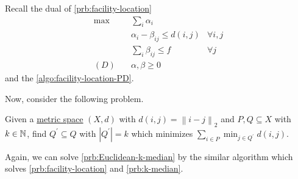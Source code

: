 \begin{prev}
	Recall the dual of \autoref{prb:facility-location}
	\begin{align*}
		\max~    & \sum_{i} \alpha _i                                  \\
		         & \alpha _i - \beta _{ij} \leq d(i, j) & \forall i, j \\
		         & \sum_{i} \beta _{ij} \leq f          & \forall j    \\
		(D)\quad & \alpha , \beta \geq 0
	\end{align*}
	and the \autoref{algo:facility-location-PD}.
\end{prev}

Now, consider the following problem.

\begin{problem}\label{prb:Euclidean-k-median}
Given a \hyperref[def:metric]{metric space} \((X, d)\) with \(d(i, j) = \left\lVert i - j\right\rVert_2\) and \(P, Q\subseteq X\) with \(k\in \mathbb{\MakeUppercase{n}} \), find \(Q^\prime \subseteq Q\) with \(\left\vert Q^\prime  \right\vert = k\) which minimizes \(\sum_{i\in P} \min _{j\in Q^\prime } d(i, j)\).
\end{problem}

Again, we can solve \autoref{prb:Euclidean-k-median} by the similar algorithm which solves \autoref{prb:facility-location} and \autoref{prb:k-median}.

